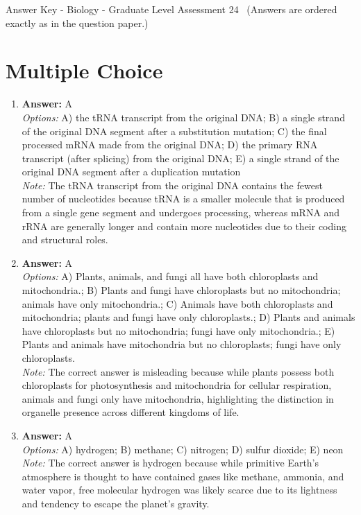 \documentclass[12pt]{article}
\begin{document}
\begin{center}
Answer Key - Biology - Graduate Level Assessment 24 \
\small (Answers are ordered exactly as in the question paper.)
\end{center}

\section*{Multiple Choice}
\begin{enumerate}[label=\arabic*.]
\item \textbf{Answer:} A
\\ \textit{Options:} A) the tRNA transcript from the original DNA; B) a single strand of the original DNA segment after a substitution mutation; C) the final processed mRNA made from the original DNA; D) the primary RNA transcript (after splicing) from the original DNA; E) a single strand of the original DNA segment after a duplication mutation
\\ \textit{Note:} The tRNA transcript from the original DNA contains the fewest number of nucleotides because tRNA is a smaller molecule that is produced from a single gene segment and undergoes processing, whereas mRNA and rRNA are generally longer and contain more nucleotides due to their coding and structural roles.
\item \textbf{Answer:} A
\\ \textit{Options:} A) Plants, animals, and fungi all have both chloroplasts and mitochondria.; B) Plants and fungi have chloroplasts but no mitochondria; animals have only mitochondria.; C) Animals have both chloroplasts and mitochondria; plants and fungi have only chloroplasts.; D) Plants and animals have chloroplasts but no mitochondria; fungi have only mitochondria.; E) Plants and animals have mitochondria but no chloroplasts; fungi have only chloroplasts.
\\ \textit{Note:} The correct answer is misleading because while plants possess both chloroplasts for photosynthesis and mitochondria for cellular respiration, animals and fungi only have mitochondria, highlighting the distinction in organelle presence across different kingdoms of life.
\item \textbf{Answer:} A
\\ \textit{Options:} A) hydrogen; B) methane; C) nitrogen; D) sulfur dioxide; E) neon
\\ \textit{Note:} The correct answer is hydrogen because while primitive Earth's atmosphere is thought to have contained gases like methane, ammonia, and water vapor, free molecular hydrogen was likely scarce due to its lightness and tendency to escape the planet's gravity.

\end{enumerate}
\end{document}
